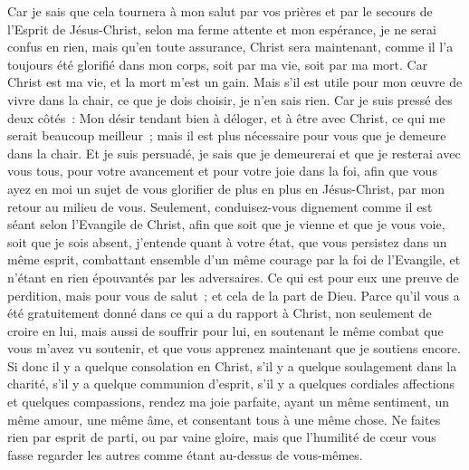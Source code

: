 \begin{multicols}{2}
Car je sais que cela tournera à mon salut par vos prières et par le secours de l'Esprit de Jésus-Christ,
selon ma ferme attente et mon espérance, je ne serai confus en rien, mais qu'en toute assurance, Christ sera maintenant, comme il l'a toujours été glorifié dans mon corps, soit par ma vie, soit par ma mort.
Car Christ est ma vie, et la mort m'est un gain.
Mais s'il est utile pour mon œuvre de vivre dans la chair, ce que je dois choisir, je n'en sais rien.
Car je suis pressé des deux côtés~: Mon désir tendant bien à déloger, et à être avec Christ, ce qui me serait beaucoup meilleur~;
mais il est plus nécessaire pour vous que je demeure dans la chair.
Et je suis persuadé, je sais que je demeurerai et que je resterai avec vous tous, pour votre avancement et pour votre joie dans la foi,
afin que vous ayez en moi un sujet de vous glorifier de plus en plus en Jésus-Christ, par mon retour au milieu de vous. 
Seulement, conduisez-vous dignement comme il est séant selon l'Evangile de Christ, afin que soit que je vienne et que je vous voie, soit que je sois absent, j'entende quant à votre état, que vous persistez dans un même esprit, combattant ensemble d'un même courage par la foi de l'Evangile, et n'étant en rien épouvantés par les adversaires.
Ce qui est pour eux une preuve de perdition, mais pour vous de salut~; et cela de la part de Dieu.
Parce qu'il vous a été gratuitement donné dans ce qui a du rapport à Christ, non seulement de croire en lui, mais aussi de souffrir pour lui,
en soutenant le même combat que vous m'avez vu soutenir, et que vous apprenez maintenant que je soutiens encore.
\VerseOne{}Si donc il y a quelque consolation en Christ, s'il y a quelque soulagement dans la charité, s'il y a quelque communion d'esprit, s'il y a quelques cordiales affections et quelques compassions,
rendez ma joie parfaite, ayant un même sentiment, un même amour, une même âme, et consentant tous à une même chose.
Ne faites rien par esprit de parti, ou par vaine gloire, mais que l'humilité de cœur vous fasse regarder les autres comme étant au-dessus de vous-mêmes.

\end{multicols}
